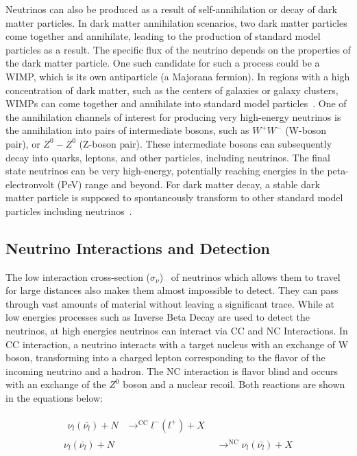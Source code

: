 Neutrinos can also be produced as a result of self-annihilation or decay of dark matter particles. In dark matter annihilation scenarios, two dark matter particles come together and annihilate, leading to the production of standard model particles as a result. The specific flux of the neutrino depends on the properties of the dark matter particle. One such candidate for such a process could be a \gls{WIMP}, which is its own antiparticle (a Majorana fermion). In regions with a high concentration of dark matter, such as the centers of galaxies or galaxy clusters, \glspl{WIMP} can come together and annihilate into standard model particles~\cite{10.1111/j.1365-2966.2008.13366.x}. One of the annihilation channels of interest for producing very high-energy neutrinos is the annihilation into pairs of intermediate bosons, such as $W^+W^-$ (W-boson pair), or $Z^0 - Z^0$ (Z-boson pair). These intermediate bosons can subsequently decay into quarks, leptons, and other particles, including neutrinos. The final state neutrinos can be very high-energy, potentially reaching energies in the peta-electronvolt (PeV) range and beyond. For dark matter decay, a stable dark matter particle is supposed to spontaneously transform to other standard model particles including neutrinos~\cite{PhysRevD.108.123021}. 


\subsection{Neutrino Interactions and Detection}
\label{subsec:Nuintdet}

The low interaction cross-section ($\sigma_{\nu}$)~\cite{Formaggio_2012} of neutrinos which allows them to travel for large distances also makes them almost impossible to detect. They can pass through vast amounts of material without leaving a significant trace. While at low energies processes such as Inverse Beta Decay are used to detect the neutrinos, at high energies neutrinos can interact via \gls{CC} and \gls{NC} Interactions. In \gls*{CC} interaction, a neutrino interacts with a target nucleus with an exchange of W boson, transforming into a charged lepton corresponding to the flavor of the incoming neutrino and a hadron. The NC interaction is flavor blind and occurs with an exchange of the $Z^0$ boson and a nuclear recoil. Both reactions are shown in the equations below:

\begin{subequations}\label{eq:NuCC_NC}
  \begin{align}
    \begin{split}
      \nu_l(\bar{\nu_l}) + N &\mathop{\longrightarrow}^{\mathrm{CC}} l^-(l^+) + X 
    \end{split} \\
    \nu_l(\bar{\nu_l}) + N &\mathop{\longrightarrow}^{\mathrm{NC}} \nu_l(\bar{\nu_l}) + X
  \end{align}
\end{subequations}

